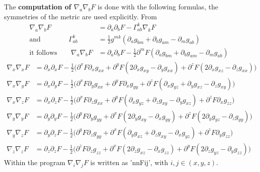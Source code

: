 \documentclass[11pt,a4paper,twoside]{article}
\begin{document}
The \textbf{computation of $\nabla_a \nabla_b F$} is done with the following
formulas, the symmetries of the metric are used explicitly. From
\begin{align}
  \nabla_a \nabla_b F &= \partial_a \partial_b F - \Gamma^k_{ab} \nabla_k F\\
 \text{and}\qquad \qquad
  \Gamma^k_{ab} &= \frac 1 2 g^{mk}(\partial_a g_{bm} +\partial_b g_{am} - \partial_m g_{ab})\\
 \text{it follows}\qquad
  \nabla_a \nabla_b F &= \partial_a \partial_b F - \frac 1 2 \partial^m F
    (\partial_a g_{bm} +\partial_b g_{am} - \partial_m g_{ab})
\end{align}
\begin{align}
  \nabla_x \nabla_x F &=\partial_x \partial_x F - \frac 1 2
    \Big( \partial^x F \partial_x g_{xx} 
        + \partial^y F(2 \partial_x g_{xy} - \partial_y g_{xx})
        + \partial^z F(2 \partial_x g_{xz} - \partial_z g_{xx}) \Big)\\
  \nabla_x \nabla_y F &=\partial_x \partial_y F - \frac 1 2
    \Big( \partial^x F \partial_y g_{xx} 
        + \partial^y F \partial_x g_{yy}
        + \partial^z F(\partial_x g_{yz} +\partial_y g_{xz} - \partial_z g_{xy}) \Big)\\
  \nabla_x \nabla_z F &=\partial_x \partial_z F - \frac 1 2
    \Big( \partial^x F \partial_z g_{xx} 
        + \partial^y F (\partial_x g_{yz} +\partial_z g_{xy} - \partial_y g_{xz})
        + \partial^z F  \partial_x g_{zz} \Big)\\
  \nabla_y \nabla_y F &=\partial_y \partial_y F - \frac 1 2
    \Big( \partial^y F \partial_y g_{yy} 
        + \partial^x F (2 \partial_y g_{xy}- \partial_x g_{yy})
        + \partial^z F (2 \partial_y g_{yz} -\partial_z g_{yy}) \Big)\\
  \nabla_y \nabla_z F &=\partial_y \partial_z F - \frac 1 2
    \Big( \partial^y F \partial_z g_{yy} 
        + \partial^x F (\partial_y g_{xz}+\partial_z g_{xy} - \partial_x g_{yz})
        + \partial^z F \partial_y g_{zz} \Big)\\
  \nabla_z \nabla_z F &=\partial_z \partial_z F - \frac 1 2
    \Big( \partial^z F \partial_z g_{zz} 
        + \partial^x F (2 \partial_z g_{xz} - \partial_x g_{zz})
        + \partial^y F (2 \partial_z g_{yz} - \partial_y g_{zz}) \Big)
\end{align}
Within the program $\nabla_i \nabla_j F$ is written as 'nnFij', with $i,j \in (x,y,z)$.
\end{document}
